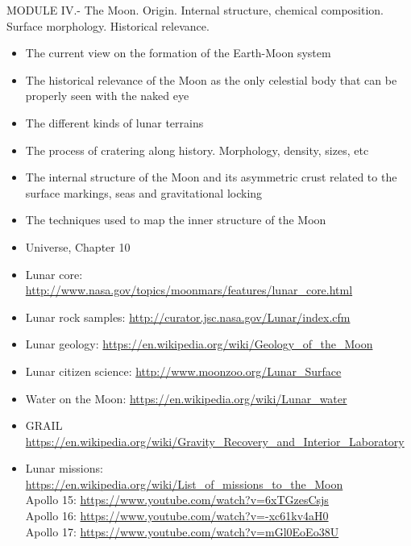 MODULE IV.- The Moon. Origin. Internal structure, chemical composition. Surface morphology. Historical relevance.

\begin{itemize}
\item The  current view on the formation of the Earth-Moon system
\item The  historical relevance of the Moon as the only celestial body that can be properly seen with the naked eye
\item The  different kinds of lunar terrains
\item The  process of cratering along history. Morphology, density, sizes, etc
\item The  internal structure of the Moon and its asymmetric
crust related to the surface markings, seas and gravitational locking
\item The techniques used to map the inner structure of the Moon
\end{itemize}

\begin{itemize}
\item Universe, Chapter 10
\item Lunar core: \url{http://www.nasa.gov/topics/moonmars/features/lunar_core.html}
\item Lunar rock samples: \url{http://curator.jsc.nasa.gov/Lunar/index.cfm}
\item Lunar geology: \url{https://en.wikipedia.org/wiki/Geology_of_the_Moon}
\item Lunar citizen science: \url{http://www.moonzoo.org/Lunar_Surface}
\item Water on the Moon: \url{https://en.wikipedia.org/wiki/Lunar_water}
\item GRAIL \url{https://en.wikipedia.org/wiki/Gravity_Recovery_and_Interior_Laboratory}
\item Lunar missions: \\
\url{https://en.wikipedia.org/wiki/List_of_missions_to_the_Moon} \\
Apollo 15: \url{https://www.youtube.com/watch?v=6xTGzesCsjs} \\
Apollo 16: \url{https://www.youtube.com/watch?v=-xc61kv4aH0} \\
Apollo 17: \url{https://www.youtube.com/watch?v=mGl0EoEo38U}
\end{itemize}